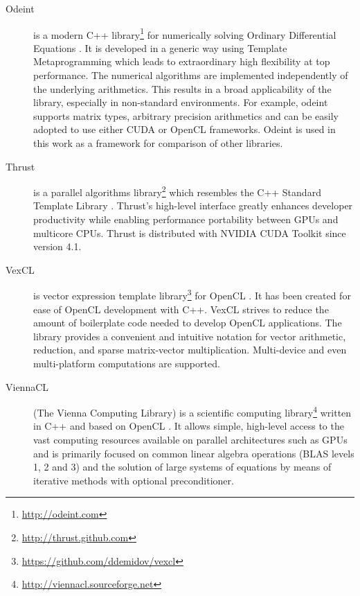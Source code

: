 \documentclass[1p]{elsarticle}
\begin{document}

\begin{description}
    \item[Odeint] is a modern C++
        library\footnote{\href{http://odeint.com}{http://odeint.com}} for
        numerically solving Ordinary Differential Equations \cite{OdeintRef1,
        OdeintRef2}. It is developed in a generic way using Template
        Metaprogramming which leads to extraordinary high flexibility at top
        performance. The numerical algorithms are implemented independently of
        the underlying arithmetics.  This results in a broad
        applicability of the library, especially in non-standard environments.
        For example, odeint supports matrix types, arbitrary precision
        arithmetics and can be easily adopted to use either CUDA or OpenCL
        frameworks.  Odeint is used in this work as a framework for comparison
        of other libraries.
    \item[Thrust] is a parallel algorithms
        library\footnote{\href{http://thrust.github.com}{http://thrust.github.com}}
        which resembles the C++ Standard Template Library \cite{ThrustRef}.
        Thrust's high-level interface greatly enhances developer productivity
        while enabling performance portability between GPUs and multicore CPUs.
        Thrust is distributed with NVIDIA CUDA Toolkit since version 4.1.
    \item[VexCL] is vector expression template
        library\footnote{\href{https://github.com/ddemidov/vexcl}{https://github.com/ddemidov/vexcl}}
        for OpenCL \cite{VexCLRef}. It has been created for ease of OpenCL
        development with C++.  VexCL strives to reduce the amount of boilerplate
        code needed to develop OpenCL applications. The library provides a
        convenient and intuitive notation for vector arithmetic, reduction, and
        sparse matrix-vector multiplication.  Multi-device and even
        multi-platform computations are supported. 
    \item[ViennaCL] (The Vienna Computing Library) is a scientific computing
        library\footnote{\href{http://viennacl.sourceforge.net}{http://viennacl.sourceforge.net}}
        written in C++ and based on OpenCL \cite{ViennaCLRef}. It allows
        simple, high-level access to the vast computing resources available on
        parallel architectures such as GPUs and is primarily focused on common
        linear algebra operations (BLAS levels 1, 2 and 3) and the solution of
        large systems of equations by means of iterative methods with optional
        preconditioner.
\end{description}
\end{document}
